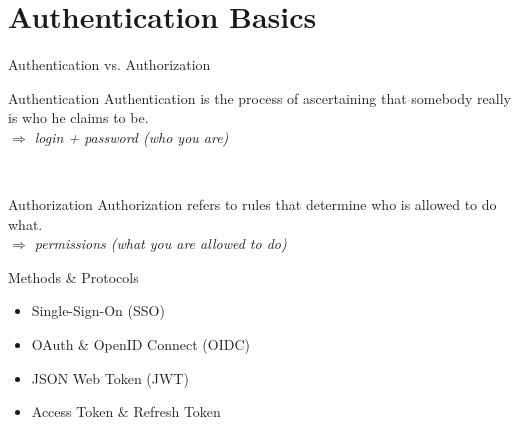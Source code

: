 \section{Authentication Basics}


\begin{frame}{Authentication vs. Authorization}
	\begin{block}{Authentication}
		Authentication is the process of ascertaining that somebody really is who he claims to be. \\
		\textit{$\Longrightarrow$ login + password (who you are)}
	\end{block}

	~\\

	\begin{block}{Authorization}
		Authorization refers to rules that determine who is allowed to do what. \\
		\textit{$\Longrightarrow$ permissions (what you are allowed to do)}
	\end{block}	
\end{frame}


\begin{frame}{Methods \& Protocols}
	\begin{itemize}
		\item Single-Sign-On (SSO)
		\item OAuth \& OpenID Connect (OIDC)
		\item JSON Web Token (JWT)
		\item Access Token \& Refresh Token
	\end{itemize}
\end{frame}


